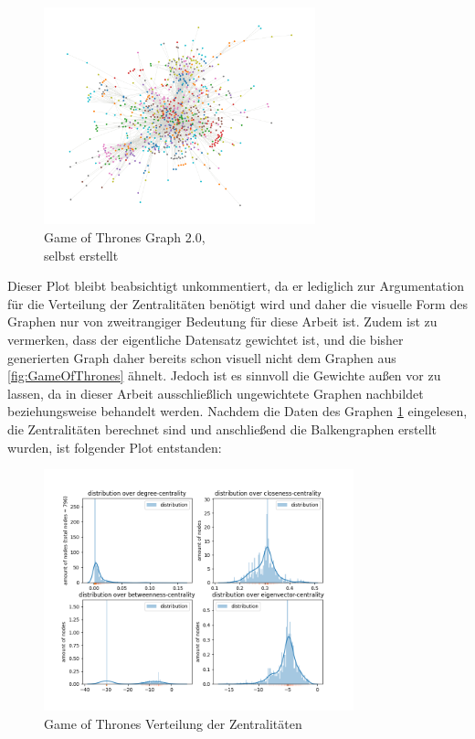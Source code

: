 \FloatBarrier
\begin{figure}[h!]%
  \centering
  \includegraphics[width=0.7\textwidth]{Graphics/GOTPlot.png}
  \caption{Game of Thrones Graph 2.0, \\
  selbst erstellt}
  \label{fig:GOT2.0}
\end{figure}
\FloatBarrier

Dieser Plot bleibt beabsichtigt unkommentiert, da er lediglich zur Argumentation für die Verteilung der Zentralitäten benötigt wird und daher die visuelle Form des Graphen nur von zweitrangiger Bedeutung für diese Arbeit ist. Zudem ist zu vermerken, dass der eigentliche Datensatz gewichtet ist, und die bisher generierten Graph daher bereits schon visuell nicht dem Graphen aus \ref{fig:GameOfThrones} ähnelt. Jedoch ist es sinnvoll die Gewichte außen vor zu lassen, da in dieser Arbeit ausschließlich ungewichtete Graphen nachbildet beziehungsweise behandelt werden. Nachdem die Daten des Graphen \ref{fig:GOT2.0} eingelesen, die Zentralitäten berechnet sind und anschließend die Balkengraphen erstellt wurden, ist folgender Plot entstanden:

\FloatBarrier
\begin{figure}[h!]%
  \centering
   \includegraphics[width=0.8\textwidth]{Graphics/GOT-Distribution.png}
  \caption{Game of Thrones Verteilung der Zentralitäten}
  \label{fig:distributionGOT}
\end{figure}
\FloatBarrier
 
